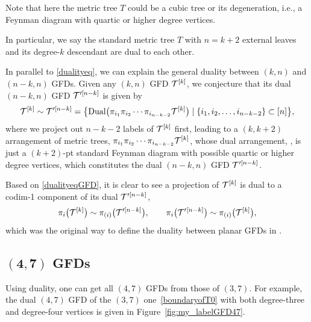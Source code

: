 \documentclass[pdftex]{sigma}
\theoremstyle{definition}
\numberwithin{equation}{section}
\begin{document}
Note that here the metric tree $T$ could be a cubic tree or its degeneration, i.e., a Feynman diagram with quartic or higher degree vertices.

In particular, we say the standard metric tree $T$ with $n=k+2$ external leaves and its degree-$k$ descendant are dual to each other.


In parallel to \eqref{dualityeq}, we can explain the general duality between $(k,n)$ and $(n-k,n)$ GFDs. Given any $(k,n)$ GFD ${\cal T}^{[k]}$, we conjecture that its dual $(n-k,n)$ GFD ${\cal T}'^{[n-k]}$ is given by
\begin{gather}
\label{dualityeqGFD}
{\cal T}^{[k]} \sim {\cal T}'^{[n-k]}=
\big\{
{\rm Dual}\big( \pi_{i_1} \pi_{i_2} \cdots \pi_{i_{n-k-2}}
{\cal T}^{[k]} \big)
\mid \{i_1,i_2,\dots,i_{n-k-2}\} \subset [n]
\big\},
\end{gather}
where we project out $n-k-2$ labels of ${\cal T}^{[k]}$ first, leading to a $(k,k+2)$ arrangement of metric trees, $\pi_{i_1} \pi_{i_2} \cdots \pi_{i_{n-k-2}}
{\cal T}^{[k]} $, whose dual arrangement, , is just a $(k+2)$-pt standard Feynman diagram  with possible quartic or higher degree vertices, which constitutes the dual $(n-k,n)$ GFD ${\cal T}'^{[n-k]}$.

Based on \eqref{dualityeqGFD}, it is clear to see a projection of ${\cal T}^{[k]}$ is dual to a codim-1 component of its dual ${\cal T}'^{[n-k]}$,
\[
\pi_{i}\big({\cal T}^{[k]} \big) \sim \pi_{(i)}\big({\cal T}'^{[n-k]} \big),\qquad \pi_{i}\big({\cal T}'{}^{[n-k]}\big) \sim \pi_{(i)}\big({\cal T}^{[k]} \big),
\]
which was the original way to define the duality between planar GFDs in \cite{Cachazo:2019xjx}.

\subsection[(4,7) GFDs]{$\boldsymbol{(4,7)}$ GFDs}
Using duality, one can get all $(4,7)$ GFDs from those of $(3,7)$.
For example, the dual $(4,7)$ GFD of the $(3,7)$ one~\eqref{boundaryofT0} with both degree-three and degree-four vertices is given in Figure~\ref{fig:my_labelGFD47}.
\end{document}
